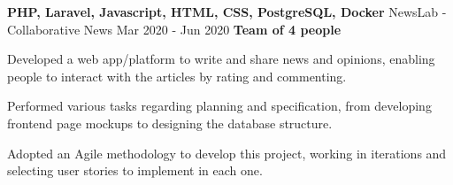   \cventry
    {\textbf{PHP, Laravel, Javascript, HTML, CSS, PostgreSQL, Docker}} %
    {NewsLab - Collaborative News \href{https://github.com/EduRibeiro00/NewsLab-feup-lbaw}{\faExternalLink}} %
    {Mar 2020 - Jun 2020} %
    {\textbf{Team of 4 people}} %
    {
      \begin{cvitems} %
        \item {Developed a web app/platform to write and share news and opinions, enabling people to interact with the articles by rating and commenting.}
        \item {Performed various tasks regarding planning and specification, from developing frontend page mockups to designing the database structure.}
        \item {Adopted an Agile methodology to develop this project, working in iterations and selecting user stories to implement in each one.}
      \end{cvitems}
    }
